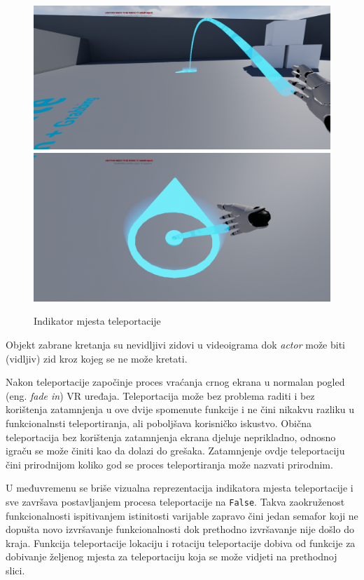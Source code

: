 \documentclass[a4paper,10pt]{article}
\begin{document}
\begin{figure}[!h]
	\centering
	\includegraphics[width=1\textwidth]{slike/tele1.png}
	\includegraphics[width=1\textwidth]{slike/tele2.png}
	\caption{Indikator mjesta teleportacije}
	\label{tele1}
\end{figure}

Objekt zabrane kretanja su nevidljivi zidovi u videoigrama dok \textit{actor}
može biti (vidljiv) zid kroz kojeg se ne može kretati.

Nakon teleportacije započinje proces vraćanja crnog ekrana u normalan pogled
(eng. \textit{fade in}) VR uređaja. Teleportacija može bez problema raditi i bez
korištenja zatamnjenja u ove dvije spomenute funkcije i ne čini nikakvu razliku
u funkcionalnsti teleportiranja, ali poboljšava korisničko iskustvo. Obična
teleportacija bez korištenja zatamnjenja ekrana djeluje neprikladno, odnosno
igraču se može činiti kao da dolazi do grešaka. Zatamnjenje ovdje teleportaciju
čini prirodnijom koliko god se proces teleportiranja može nazvati prirodnim.

U međuvremenu se briše vizualna reprezentacija indikatora
mjesta teleportacije i sve završava postavljanjem procesa teleportacije na
\texttt{False}. Takva zaokruženost funkcionalnosti ispitivanjem istinitosti
varijable zapravo čini jedan semafor koji ne dopušta novo izvršavanje
funkcionalnosti dok prethodno izvršavanje nije došlo do kraja. Funkcija
teleportacije lokaciju i rotaciju teleportacije dobiva od funkcije za dobivanje
željenog mjesta za teleportaciju koja se može vidjeti na prethodnoj slici.
\end{document}
